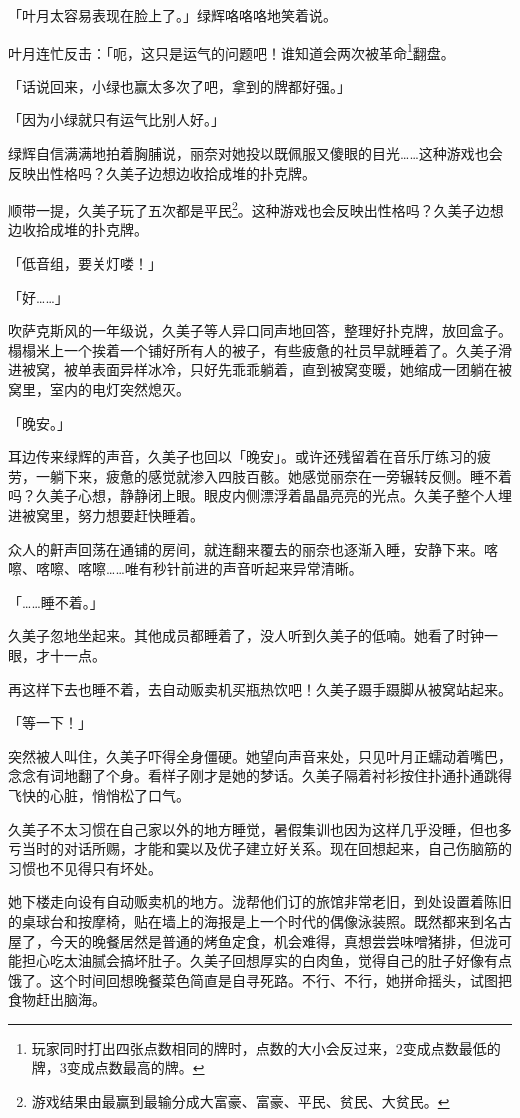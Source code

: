 \documentclass[UTF8]{ctexart}
\begin{document}
    「叶月太容易表现在脸上了。」绿辉咯咯咯地笑着说。 

    叶月连忙反击：「呃，这只是运气的问题吧！谁知道会两次被革命\footnote{玩家同时打出四张点数相同的牌时，点数的大小会反过来，2变成点数最低的牌，3变成点数最高的牌。}翻盘。

    「话说回来，小绿也赢太多次了吧，拿到的牌都好强。」 

    「因为小绿就只有运气比别人好。」 

    绿辉自信满满地拍着胸脯说，丽奈对她投以既佩服又傻眼的目光……这种游戏也会反映出性格吗？久美子边想边收拾成堆的扑克牌。 

    顺带一提，久美子玩了五次都是平民\footnote{游戏结果由最赢到最输分成大富豪、富豪、平民、贫民、大贫民。}。这种游戏也会反映出性格吗？久美子边想边收拾成堆的扑克牌。

    「低音组，要关灯喽！」 

    「好……」 

    吹萨克斯风的一年级说，久美子等人异口同声地回答，整理好扑克牌，放回盒子。榻榻米上一个挨着一个铺好所有人的被子，有些疲惫的社员早就睡着了。久美子滑进被窝，被单表面异样冰冷，只好先乖乖躺着，直到被窝变暖，她缩成一团躺在被窝里，室内的电灯突然熄灭。 

    「晚安。」 

    耳边传来绿辉的声音，久美子也回以「晚安」。或许还残留着在音乐厅练习的疲劳，一躺下来，疲惫的感觉就渗入四肢百骸。她感觉丽奈在一旁辗转反侧。睡不着吗？久美子心想，静静闭上眼。眼皮内侧漂浮着晶晶亮亮的光点。久美子整个人埋进被窝里，努力想要赶快睡着。 

    众人的鼾声回荡在通铺的房间，就连翻来覆去的丽奈也逐渐入睡，安静下来。喀嚓、喀嚓、喀嚓……唯有秒针前进的声音听起来异常清晰。 

    「……睡不着。」 

    久美子忽地坐起来。其他成员都睡着了，没人听到久美子的低喃。她看了时钟一眼，才十一点。 

    再这样下去也睡不着，去自动贩卖机买瓶热饮吧！久美子蹑手蹑脚从被窝站起来。 

    「等一下！」 

    突然被人叫住，久美子吓得全身僵硬。她望向声音来处，只见叶月正蠕动着嘴巴，念念有词地翻了个身。看样子刚才是她的梦话。久美子隔着衬衫按住扑通扑通跳得飞快的心脏，悄悄松了口气。 

    久美子不太习惯在自己家以外的地方睡觉，暑假集训也因为这样几乎没睡，但也多亏当时的对话所赐，才能和霙以及优子建立好关系。现在回想起来，自己伤脑筋的习惯也不见得只有坏处。 

    她下楼走向设有自动贩卖机的地方。泷帮他们订的旅馆非常老旧，到处设置着陈旧的桌球台和按摩椅，贴在墙上的海报是上一个时代的偶像泳装照。既然都来到名古屋了，今天的晚餐居然是普通的烤鱼定食，机会难得，真想尝尝味噌猪排，但泷可能担心吃太油腻会搞坏肚子。久美子回想厚实的白肉鱼，觉得自己的肚子好像有点饿了。这个时间回想晚餐菜色简直是自寻死路。不行、不行，她拼命摇头，试图把食物赶出脑海。 
\end{document}
